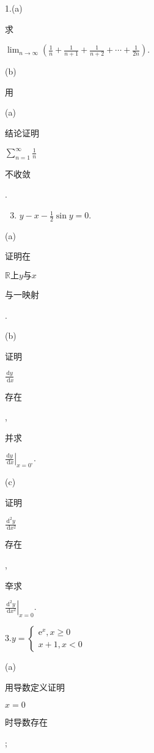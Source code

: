 \documentclass[10pt]{article}
\begin{document}
1.(a) \begin{CJK}{UTF8}{mj}求\end{CJK} $\lim _{n \rightarrow \infty}\left(\frac{1}{n}+\frac{1}{n+1}+\frac{1}{n+2}+\cdots+\frac{1}{2 n}\right)$.

(b) \begin{CJK}{UTF8}{mj}用\end{CJK} (a) \begin{CJK}{UTF8}{mj}结论证明\end{CJK} $\sum_{n=1}^{\infty} \frac{1}{n}$ \begin{CJK}{UTF8}{mj}不收敛\end{CJK}.

\begin{enumerate}
  \setcounter{enumi}{2}
  \item $y-x-\frac{1}{2} \sin y=0$.
\end{enumerate}
(a) \begin{CJK}{UTF8}{mj}证明在\end{CJK} $\mathbb{R} 上 y 与 x$ \begin{CJK}{UTF8}{mj}与一映射\end{CJK}.

(b) \begin{CJK}{UTF8}{mj}证明\end{CJK} $\frac{\mathrm{d} y}{\mathrm{~d} x}$ \begin{CJK}{UTF8}{mj}存在\end{CJK}, \begin{CJK}{UTF8}{mj}并求\end{CJK} $\left.\frac{\mathrm{d} y}{\mathrm{~d} x}\right|_{x=0^{\circ}}$.

(c) \begin{CJK}{UTF8}{mj}证明\end{CJK} $\frac{\mathrm{d}^{2} y}{\mathrm{~d} x^{2}}$ \begin{CJK}{UTF8}{mj}存在\end{CJK}, \begin{CJK}{UTF8}{mj}㚔求\end{CJK} $\left.\frac{\mathrm{d}^{2} y}{\mathrm{~d} x^{2}}\right|_{x=0}$.

$3 . y=\left\{\begin{array}{l}\mathrm{e}^{x}, x \geq 0 \\ x+1, x<0\end{array}\right.$

(a) \begin{CJK}{UTF8}{mj}用导数定义证明\end{CJK} $x=0$ \begin{CJK}{UTF8}{mj}时导数存在\end{CJK};
\end{document}
